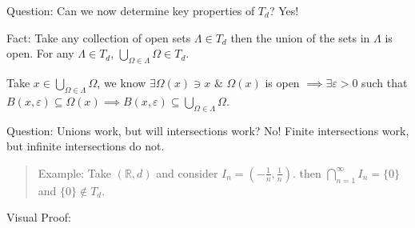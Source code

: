\documentclass[10pt]{article}
\begin{document}
Question: Can we now determine key properties of $T_{d}$? Yes!

Fact: Take any collection of open sets $\Lambda\in T_{d}$ then the union of the sets in $\Lambda$ is open. For any $\Lambda\in T_{d}$, $\bigcup_{\Omega\in\Lambda}\Omega\in T_{d}$.

Take $x\in\bigcup_{\Omega\in\Lambda}\Omega$, we know $\exists\Omega(x)\ni x$ \& $\Omega(x)$ is open $\implies\exists\varepsilon>0$ such that $B(x,\varepsilon)\subseteq\Omega(x)\implies B(x,\varepsilon)\subseteq\bigcup_{\Omega\in\Lambda}\Omega$.

Question: Unions work, but will intersections work? No! Finite intersections work, but infinite intersections do not. 
\begin{quote}
    Example: Take $(\mathbb{R}, d)$ and consider $I_{n}=(-\frac{1}{n},\frac{1}{n})$. then $\bigcap_{n=1}^{\infty}I_{n}=\{0\}$ and $\{0\}\notin T_{d}$. 
\end{quote}
Visual Proof:
\end{document}
